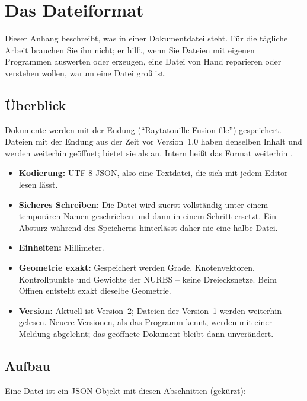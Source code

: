 \chapter{Das Dateiformat \texorpdfstring{}{.rttf}}\label{kap:dateiformat}

Dieser Anhang beschreibt, was in einer Dokumentdatei steht. Für die tägliche Arbeit
brauchen Sie ihn nicht; er hilft, wenn Sie Dateien mit eigenen Programmen auswerten oder
erzeugen, eine Datei von Hand reparieren oder verstehen wollen, warum eine Datei groß ist.

\section{Überblick}

Dokumente werden mit der Endung  (\enquote{Raytatouille Fusion file})
gespeichert. Dateien mit der Endung  aus der Zeit vor Version~1.0 haben
denselben Inhalt und werden weiterhin geöffnet;  bietet sie als
 an. Intern heißt das Format weiterhin .

\begin{itemize}
  \item \textbf{Kodierung:} UTF-8-JSON, also eine Textdatei, die sich mit jedem Editor
    lesen lässt.
  \item \textbf{Sicheres Schreiben:} Die Datei wird zuerst vollständig unter einem
    temporären Namen geschrieben und dann in einem Schritt ersetzt. Ein Absturz während des
    Speicherns hinterlässt daher nie eine halbe Datei.
  \item \textbf{Einheiten:} Millimeter.
  \item \textbf{Geometrie exakt:} Gespeichert werden Grade, Knotenvektoren, Kontrollpunkte
    und Gewichte der NURBS -- keine Dreiecksnetze. Beim Öffnen entsteht exakt dieselbe
    Geometrie.
  \item \textbf{Version:} Aktuell ist Version~2; Dateien der Version~1 werden weiterhin
    gelesen. Neuere Versionen, als das Programm kennt, werden mit einer Meldung abgelehnt; das
    geöffnete Dokument bleibt dann unverändert.
\end{itemize}

\section{Aufbau}

Eine Datei ist ein JSON-Objekt mit diesen Abschnitten (gekürzt):

